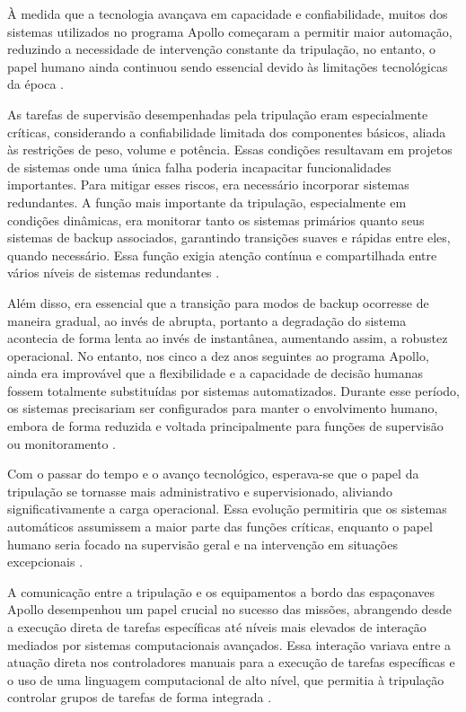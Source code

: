À medida que a tecnologia avançava em capacidade e confiabilidade, muitos dos sistemas utilizados no programa Apollo começaram a permitir maior automação, reduzindo a necessidade de intervenção constante da tripulação, no entanto, o papel humano ainda continuou sendo essencial devido às limitações tecnológicas da época \citep{nevins1971}.

As tarefas de supervisão desempenhadas pela tripulação eram especialmente críticas, considerando a confiabilidade limitada dos componentes básicos, aliada às restrições de peso, volume e potência. Essas condições resultavam em projetos de sistemas onde uma única falha poderia incapacitar funcionalidades importantes. Para mitigar esses riscos, era necessário incorporar sistemas redundantes. A função mais importante da tripulação, especialmente em condições dinâmicas, era monitorar tanto os sistemas primários quanto seus sistemas de backup associados, garantindo transições suaves e rápidas entre eles, quando necessário. Essa função exigia atenção contínua e compartilhada entre vários níveis de sistemas redundantes \citep{nevins1971}.

Além disso, era essencial que a transição para modos de backup ocorresse de maneira gradual, ao invés de abrupta, portanto a degradação do sistema acontecia de forma lenta ao invés de instantânea, aumentando assim, a robustez operacional. No entanto, nos cinco a dez anos seguintes ao programa Apollo, ainda era improvável que a flexibilidade e a capacidade de decisão humanas fossem totalmente substituídas por sistemas automatizados. Durante esse período, os sistemas precisariam ser configurados para manter o envolvimento humano, embora de forma reduzida e voltada principalmente para funções de supervisão ou monitoramento \citep{nevins1971}.

Com o passar do tempo e o avanço tecnológico, esperava-se que o papel da tripulação se tornasse mais administrativo e supervisionado, aliviando significativamente a carga operacional. Essa evolução permitiria que os sistemas automáticos assumissem a maior parte das funções críticas, enquanto o papel humano seria focado na supervisão geral e na intervenção em situações excepcionais \citep{nevins1971}.

A comunicação entre a tripulação e os equipamentos a bordo das espaçonaves Apollo desempenhou um papel crucial no sucesso das missões, abrangendo desde a execução direta de tarefas específicas até níveis mais elevados de interação mediados por sistemas computacionais avançados. Essa interação variava entre a atuação direta nos controladores manuais para a execução de tarefas específicas e o uso de uma linguagem computacional de alto nível, que permitia à tripulação controlar grupos de tarefas de forma integrada \citep{nevins1971}.

